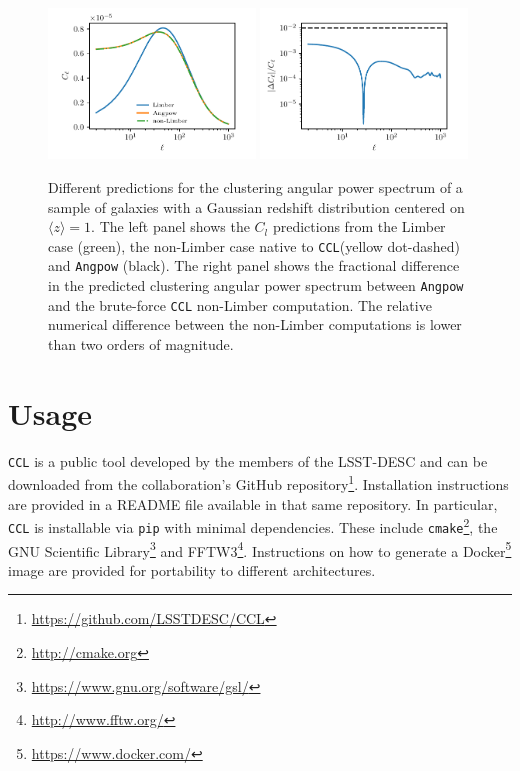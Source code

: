 \documentclass[\docopts]{\docclass}
\newcommand{\ccl}{{\tt CCL}\xspace}
\begin{document}
\begin{figure}[htbp]
\centering
\includegraphics[width=0.49\textwidth]{angpow1}
\includegraphics[width=0.49\textwidth]{angpow3}
\caption{Different predictions for the clustering angular power spectrum of a sample of galaxies with a Gaussian redshift distribution centered on $\langle z \rangle =1$. The left panel shows the $C_l$ predictions from the Limber case (green), the non-Limber case native to \ccl (yellow dot-dashed) and {\tt Angpow} (black). The right panel shows the fractional difference in the predicted clustering angular power spectrum between {\tt Angpow} and the brute-force \ccl non-Limber computation. The relative numerical difference between the non-Limber computations is lower than two orders of magnitude.}
\label{fig:angpow}
\end{figure}

\section{Usage}
\label{sec:usage}

\ccl is a public tool developed by the members of the LSST-DESC and can be downloaded from the collaboration's GitHub repository\footnote{\url{https://github.com/LSSTDESC/CCL}}. Installation instructions are provided in a README file available in that same repository. In particular, \ccl is installable via {\tt pip} with minimal dependencies. These include {\tt cmake}\footnote{\url{http://cmake.org}}, the GNU Scientific Library\footnote{\url{https://www.gnu.org/software/gsl/}} and FFTW3\footnote{\url{http://www.fftw.org/}}. Instructions on how to generate a Docker\footnote{\url{https://www.docker.com/}} image are provided for portability to different architectures.
\end{document}
